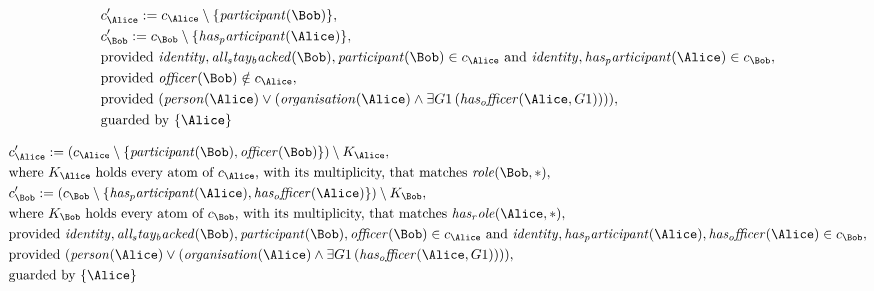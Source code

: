 \begin{align*}
&
c'_
{
\Alice
}
 := 
c_
{
\Alice
}
 \setminus 
\{
\mathit{
participant
}
(
\Bob
)
\}
,\\
&
c'_
{
\Bob
}
 := 
c_
{
\Bob
}
 \setminus 
\{
\mathit{
has_participant
}
(
\Alice
)
\}
,\\
&
\text{provided } 
\mathit{
identity
}
,
\mathit{
all_stay_backed
}
(
\Bob
)
,
\mathit{
participant
}
(
\Bob
)
 \in c_
{
\Alice
}
 \text{ and } 
\mathit{
identity
}
,
\mathit{
has_participant
}
(
\Alice
)
 \in c_
{
\Bob
}
,\\
&
\text{provided } 
\mathit{
officer
}
(
\Bob
)
 \notin c_
{
\Alice
}
,\\
&
\text{provided } 
(
\mathit{
person
}
(
\Alice
)
\lor
(
\mathit{
organisation
}
(
\Alice
)
\land
\exists 
G1
\,(
\mathit{
has_officer
}
(
\Alice
,
G1
)
)
)
)
,\\
&
\text{guarded by } \{
\Alice
\}
\end{align*}

\begin{align*}
&
c'_
{
\Alice
}
 := 
(c_
{
\Alice
}
 \setminus 
\{
\mathit{
participant
}
(
\Bob
)
,
\mathit{
officer
}
(
\Bob
)
\}
) \setminus K_
{
\Alice
}
,\\
&
\text{where } K_
{
\Alice
}
 \text{ holds every atom of } c_
{
\Alice
}
 \text{, with its multiplicity, that matches } 
\mathit{
role
}
(
\Bob
,
\ast
)
,\\
&
c'_
{
\Bob
}
 := 
(c_
{
\Bob
}
 \setminus 
\{
\mathit{
has_participant
}
(
\Alice
)
,
\mathit{
has_officer
}
(
\Alice
)
\}
) \setminus K_
{
\Bob
}
,\\
&
\text{where } K_
{
\Bob
}
 \text{ holds every atom of } c_
{
\Bob
}
 \text{, with its multiplicity, that matches } 
\mathit{
has_role
}
(
\Alice
,
\ast
)
,\\
&
\text{provided } 
\mathit{
identity
}
,
\mathit{
all_stay_backed
}
(
\Bob
)
,
\mathit{
participant
}
(
\Bob
)
,
\mathit{
officer
}
(
\Bob
)
 \in c_
{
\Alice
}
 \text{ and } 
\mathit{
identity
}
,
\mathit{
has_participant
}
(
\Alice
)
,
\mathit{
has_officer
}
(
\Alice
)
 \in c_
{
\Bob
}
,\\
&
\text{provided } 
(
\mathit{
person
}
(
\Alice
)
\lor
(
\mathit{
organisation
}
(
\Alice
)
\land
\exists 
G1
\,(
\mathit{
has_officer
}
(
\Alice
,
G1
)
)
)
)
,\\
&
\text{guarded by } \{
\Alice
\}
\end{align*}

